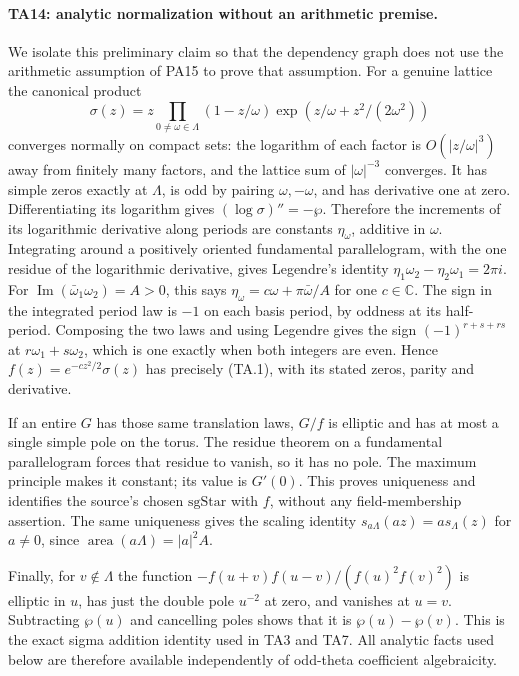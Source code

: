 \paragraph{TA14: analytic normalization without an arithmetic premise.}
We isolate this preliminary claim so that the dependency graph does
not use the arithmetic assumption of PA15 to prove that assumption.
For a genuine lattice the canonical product
\[
 \sigma(z)=z\prod_{0\ne\omega\in\Lambda}
       (1-z/\omega)\exp(z/\omega+z^2/(2\omega^2))
\]
converges normally on compact sets: the logarithm of each factor
is $O(|z/\omega|^3)$ away from finitely many factors, and the
lattice sum of $|\omega|^{-3}$ converges. It has simple zeros
exactly at $\Lambda$, is odd by pairing $\omega,-\omega$, and
has derivative one at zero. Differentiating its logarithm
gives $(\log\sigma)''=-\wp$. Therefore the increments of its
logarithmic derivative along periods are constants
$\eta_\omega$, additive in $\omega$. Integrating around a
positively oriented fundamental parallelogram, with the one
residue of the logarithmic derivative, gives Legendre's
identity $\eta_1\omega_2-\eta_2\omega_1=2\pi i$.
For $\operatorname{Im}(\bar\omega_1\omega_2)=A>0$, this says
$\eta_\omega=c\omega+\pi\bar\omega/A$ for one $c\in\mathbb C$.
The sign in the integrated period law is $-1$ on each basis
period, by oddness at its half-period. Composing the two laws
and using Legendre gives the sign
$(-1)^{r+s+rs}$ at $r\omega_1+s\omega_2$, which is one
exactly when both integers are even. Hence
$f(z)=e^{-cz^2/2}\sigma(z)$ has precisely (TA.1), with its
stated zeros, parity and derivative.

If an entire $G$ has those same translation laws, $G/f$ is
elliptic and has at most a single simple pole on the torus.
The residue theorem on a fundamental parallelogram forces
that residue to vanish, so it has no pole. The maximum
principle makes it constant; its value is $G'(0)$.
This proves uniqueness and identifies the source's chosen
$\mathrm{sgStar}$ with $f$, without any field-membership
assertion. The same uniqueness gives the scaling identity
$s_{a\Lambda}(az)=a s_\Lambda(z)$ for $a\ne0$, since
$\operatorname{area}(a\Lambda)=|a|^2A$.

Finally, for $v\notin\Lambda$ the function
$-f(u+v)f(u-v)/(f(u)^2f(v)^2)$ is elliptic in $u$,
has just the double pole $u^{-2}$ at zero, and vanishes
at $u=v$. Subtracting $\wp(u)$ and cancelling poles shows
that it is $\wp(u)-\wp(v)$. This is the exact sigma addition
identity used in TA3 and TA7. All analytic facts used below
are therefore available independently of odd-theta
coefficient algebraicity.

